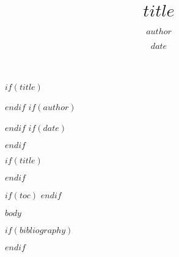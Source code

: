 \documentclass[$if(fontsize)$$fontsize$,$endif$$if(papersize)$$papersize$paper,$endif$$for(classoption)$$classoption$$sep$,$endfor$]{$documentclass$}
\begin{document}
$if(title)$
\title{$title$}
$endif$
$if(author)$
\author{$author$}
$endif$
$if(date)$
\date{$date$}
$endif$

$if(title)$
\maketitle
$endif$

$if(toc)$
\tableofcontents
$endif$

$body$

$if(bibliography)$

$endif$
\end{document}

